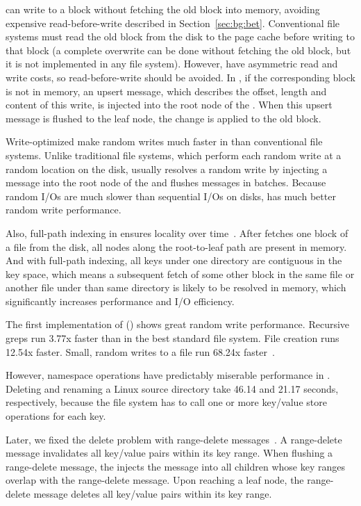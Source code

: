 \betrfs can write to a block without fetching the old block into memory, avoiding
expensive read-before-write described in Section~\ref{sec:bg:bet}.
Conventional file systems must read the old block from the disk to the page
cache before writing to that block (a complete overwrite can be done without
fetching the old block, but it is not implemented in any file system).
However, \bets have asymmetric read and write costs, so read-before-write should
be avoided.
In \betrfs, if the corresponding block is not in memory, an upsert message,
which describes the offset, length and content of this write, is injected into
the root node of the \bet.
When this upsert message is flushed to the leaf node, the change is applied to
the old block.

Write-optimized \bets make random writes much faster in \betrfs than
conventional file systems.
Unlike traditional file systems,
which perform each random write at a random location on the disk,
\betrfs usually resolves a random write by injecting a message into the root
node of the \bet
and flushes messages in batches.
Because random I/Os are much slower than sequential I/Os on disks,
\betrfs has much better random write performance.

Also, full-path indexing in \betrfs ensures locality over time~\citep{betrfs3}.
After \betrfs fetches one block of a file from the disk, all nodes along the
root-to-leaf path are present in memory.
And with full-path indexing, all keys under one directory are contiguous in the
key space, which means a subsequent fetch of some other block in the same file or
another file under than same directory is likely to be resolved in memory,
which significantly increases performance and I/O efficiency.

The first implementation of \betrfs (\betrfsOne) shows great random write
performance.
Recursive greps run 3.77x faster than in the best standard file system.
File creation runs 12.54x faster.
Small, random writes to a file run 68.24x faster~\citep{betrfs1tos}.

However, namespace operations have predictably miserable performance in
\betrfsOne.
Deleting and renaming a Linux source directory take 46.14 and 21.17 seconds,
respectively, because the file system has to call one or more key/value store
operations for each key.

Later, we fixed the delete problem with range-delete messages~\citep{betrfs2,betrfs2tos}.
A range-delete message invalidates all key/value pairs within its key range.
When flushing a range-delete message, the \bet injects the message into all
children whose key ranges overlap with the range-delete message.
Upon reaching a leaf node, the range-delete message deletes all key/value pairs
within its key range.

